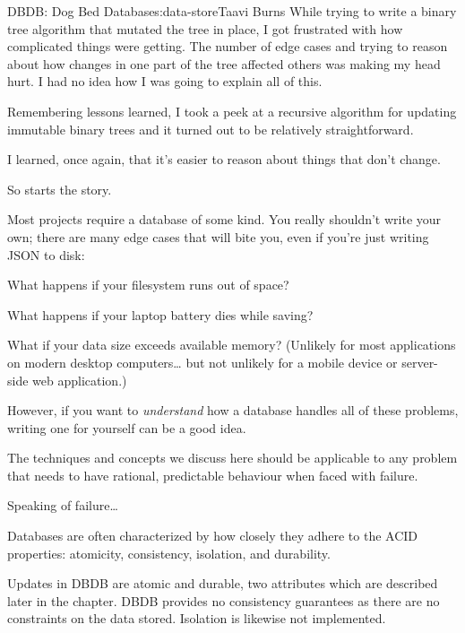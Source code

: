 \begin{aosachapter}{DBDB: Dog Bed Database}{s:data-store}{Taavi Burns}
While trying to write a binary tree algorithm that mutated the tree in
place, I got frustrated with how complicated things were getting. The
number of edge cases and trying to reason about how changes in one part
of the tree affected others was making my head hurt. I had no idea how I
was going to explain all of this.

Remembering lessons learned, I took a peek at a recursive algorithm for
updating immutable binary trees and it turned out to be relatively
straightforward.

I learned, once again, that it's easier to reason about things that
don't change.

So starts the story.

\label{why-is-it-interesting}

Most projects require a database of some kind. You really shouldn't
write your own; there are many edge cases that will bite you, even if
you're just writing JSON to disk:

\begin{aosaitemize}

\item
  What happens if your filesystem runs out of space?
\item
  What happens if your laptop battery dies while saving?
\item
  What if your data size exceeds available memory? (Unlikely for most
  applications on modern desktop computers\ldots{} but not unlikely for
  a mobile device or server-side web application.)
\end{aosaitemize}

However, if you want to \emph{understand} how a database handles all of
these problems, writing one for yourself can be a good idea.

The techniques and concepts we discuss here should be applicable to any
problem that needs to have rational, predictable behaviour when faced
with failure.

Speaking of failure\ldots{}

\label{characterizing-failure}

Databases are often characterized by how closely they adhere to the ACID
properties: atomicity, consistency, isolation, and durability.

Updates in DBDB are atomic and durable, two attributes which are
described later in the chapter. DBDB provides no consistency guarantees
as there are no constraints on the data stored. Isolation is likewise
not implemented.


\end{aosachapter}
